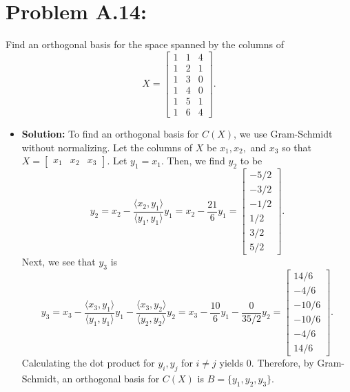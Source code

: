 \documentclass[11pt]{article}
\begin{document}
\section*{Problem A.14:}
Find an orthogonal basis for the space spanned by the columns of 
\[
X = \begin{bmatrix}
1 & 1 & 4 \\
1 & 2 & 1 \\
1 & 3 & 0 \\
1 & 4 & 0 \\
1 & 5 & 1 \\
1 & 6 & 4
\end{bmatrix}.
\]
\begin{itemize}
\item[] {\bf Solution:}    To find an orthogonal basis for $C(X)$, we use Gram-Schmidt without normalizing.  Let the columns of $X$ be $x_1,x_2,$ and $x_3$ so that $X = \begin{bmatrix}
x_1 & x_2 & x_3
\end{bmatrix}$.
Let $y_1 = x_1$.
Then, we find $y_2$ to be
\[
y_2 = x_2 - \frac{\langle x_2,y_1\rangle}{\langle y_1, y_1\rangle}y_1 = x_2 - \frac{21}{6}y_1 = \begin{bmatrix}
-5/2 \\ -3/2 \\ -1/2 \\ 1/2 \\ 3/2 \\ 5/2
\end{bmatrix}.
\]
Next, we see that $y_3$ is
\[
y_3 = x_3 - \frac{\langle x_3,y_1\rangle}{\langle y_1, y_1\rangle}y_1 - \frac{\langle x_3,y_2\rangle}{\langle y_2, y_2\rangle}y_2 = x_3 - \frac{10}{6}y_1 - \frac{0}{35/2}y_2 = \begin{bmatrix}
14/6 \\ -4/6 \\ -10/6 \\ - 10/6 \\ -4/6 \\ 14/6
\end{bmatrix}.
\]
Calculating the dot product for $y_i,y_j$ for $i\not= j$ yields 0.  Therefore, by Gram-Schmidt, an orthogonal basis for $C(X)$ is $B = \{y_1,y_2,y_3\}$.
\end{itemize}
\end{document}
